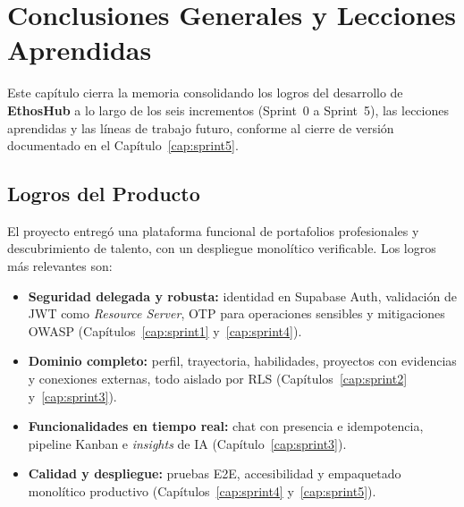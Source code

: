 \chapter{Conclusiones Generales y Lecciones Aprendidas}
\label{cap:conclusiones}

Este capítulo cierra la memoria consolidando los logros del desarrollo de \textbf{EthosHub} a lo
largo de los seis incrementos (Sprint~0 a Sprint~5), las lecciones aprendidas y las líneas de
trabajo futuro, conforme al cierre de versión documentado en el Capítulo~\ref{cap:sprint5}.\par

\section{Logros del Producto}
\label{sec:concl_logros}
El proyecto entregó una plataforma funcional de portafolios profesionales y descubrimiento de
talento, con un despliegue monolítico verificable. Los logros más relevantes son:

\begin{itemize}[noitemsep]
    \item \textbf{Seguridad delegada y robusta:} identidad en Supabase Auth, validación de JWT
    como \textit{Resource Server}, OTP para operaciones sensibles y mitigaciones OWASP
    (Capítulos~\ref{cap:sprint1} y~\ref{cap:sprint4}).
    \item \textbf{Dominio completo:} perfil, trayectoria, habilidades, proyectos con evidencias y
    conexiones externas, todo aislado por RLS (Capítulos~\ref{cap:sprint2} y~\ref{cap:sprint3}).
    \item \textbf{Funcionalidades en tiempo real:} chat con presencia e idempotencia, pipeline
    Kanban e \textit{insights} de IA (Capítulo~\ref{cap:sprint3}).
    \item \textbf{Calidad y despliegue:} pruebas E2E, accesibilidad y empaquetado monolítico
    productivo (Capítulos~\ref{cap:sprint4} y~\ref{cap:sprint5}).
\end{itemize}

